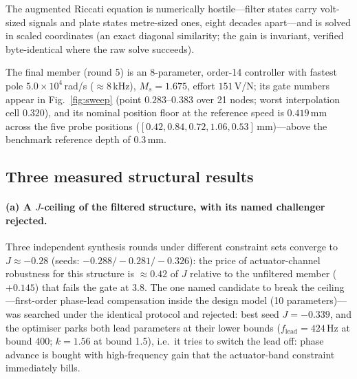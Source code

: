 \documentclass[preprint,12pt]{elsarticle}
\begin{document}
The augmented Riccati equation is numerically hostile---filter states
carry volt-sized signals and plate states metre-sized ones, eight
decades apart---and is solved in scaled coordinates (an exact diagonal
similarity; the gain is invariant, verified byte-identical where the
raw solve succeeds).

The final member (round 5) is an 8-parameter, order-14 controller
with fastest pole $5.0\times10^{4}$\,rad/s ($\approx 8$\,kHz),
$M_s = 1.675$, effort $151$\,V/N; its gate numbers appear in
Fig.~\ref{fig:sweep} (point $0.283$--$0.383$ over 21 nodes; worst
interpolation cell $0.320$), and its nominal position floor at the
reference speed is $0.419$\,mm across the five probe positions
($[0.42, 0.84, 0.72, 1.06, 0.53]$\,mm)---above the benchmark reference
depth of $0.3$\,mm.

\subsection{Three measured structural results}

\paragraph{(a) A $J$-ceiling of the filtered structure, with its named
challenger rejected.}  Three independent synthesis rounds under
different constraint sets converge to $J \approx -0.28$
(seeds: $-0.288/-0.281/-0.326$): the price of actuator-channel
robustness for this structure is $\approx 0.42$ of $J$ relative to the
unfiltered member ($+0.145$) that fails the gate at $3.8$.  The one
named candidate to break the ceiling---first-order phase-lead
compensation inside the design model (10 parameters)---was searched
under the identical protocol and rejected: best seed
$J = -0.339$, and the optimiser parks both lead parameters at their
lower bounds ($f_{\mathrm{lead}} = 424$\,Hz at bound 400;
$k = 1.56$ at bound 1.5), i.e.\ it tries to switch the lead off: phase
advance is bought with high-frequency gain that the actuator-band
constraint immediately bills.
\end{document}
